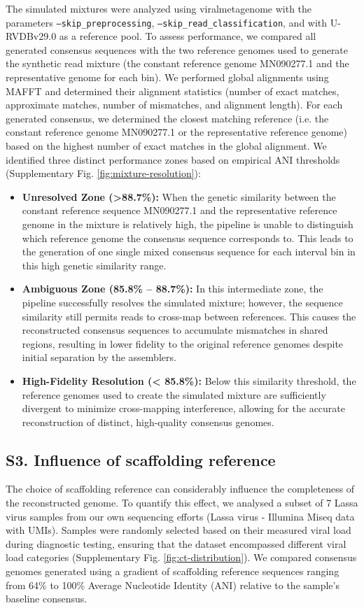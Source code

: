 The simulated mixtures were analyzed using viralmetagenome with the parameters \texttt{--skip\_preprocessing}, \texttt{--skip\_read\_classification}, and with U-RVDBv29.0 as a reference pool. To assess performance, we compared all generated consensus sequences with the two reference genomes used to generate the synthetic read mixture (the constant reference genome MN090277.1 and the representative genome for each bin). We performed global alignments using MAFFT \citep{Katoh2002-ox} and determined their alignment statistics (number of exact matches, approximate matches, number of mismatches, and alignment length). For each generated consensus, we determined the closest matching reference (i.e. the constant reference genome MN090277.1 or the representative reference genome) based on the highest number of exact matches in the global alignment. We identified three distinct performance zones based on empirical ANI thresholds (Supplementary Fig. \ref{fig:mixture-resolution}):
\begin{itemize}
    \item \textbf{Unresolved Zone (>88.7\%):} When the genetic similarity between the constant reference sequence MN090277.1 and the representative reference genome in the mixture is relatively high, the pipeline is unable to distinguish which reference genome the consensus sequence corresponds to. This leads to the generation of one single mixed consensus sequence for each interval bin in this high genetic similarity range.
    \item \textbf{Ambiguous Zone (85.8\% – 88.7\%):} In this intermediate zone, the pipeline successfully resolves the simulated mixture; however, the sequence similarity still permits reads to cross-map between references. This causes the reconstructed consensus sequences to accumulate mismatches in shared regions, resulting in lower fidelity to the original reference genomes despite initial separation by the assemblers.
    \item \textbf{High-Fidelity Resolution (< 85.8\%):}  Below this similarity threshold, the reference genomes used to create the simulated mixture are sufficiently divergent to minimize cross-mapping interference, allowing for the accurate reconstruction of distinct, high-quality consensus genomes.
\end{itemize}

\subsection*{S3. Influence of scaffolding reference}
The choice of scaffolding reference can considerably influence the completeness of the reconstructed genome. To quantify this effect, we analysed a subset of 7 Lassa virus samples from our own sequencing efforts (Lassa virus - Illumina Miseq data with UMIs). Samples were randomly selected based on their measured viral load during diagnostic testing, ensuring that the dataset encompassed different viral load categories (Supplementary Fig. \ref{fig:ct-distribution}). We compared consensus genomes generated using a gradient of scaffolding reference sequences ranging from 64\% to 100\% Average Nucleotide Identity (ANI) relative to the sample's baseline consensus.

